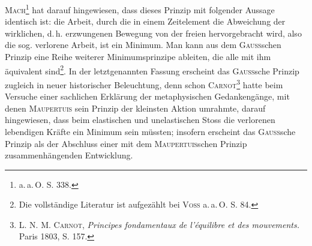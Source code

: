 \textsc{Mach}\footnote{a.\,a.\,O. S. 338.} hat darauf hingewiesen, dass dieses Prinzip mit folgender Aussage
identisch ist: die Arbeit, durch die in einem Zeitelement die Abweichung
der wirklichen, d.\,h. erzwungenen Bewegung von der freien hervorgebracht
wird, also die sog. verlorene Arbeit, ist ein Minimum. Man kann aus dem
\textsc{Gauss}schen Prinzip eine Reihe weiterer Minimumsprinzipe ableiten, die alle
mit ihm äquivalent sind\footnote{Die vollständige Literatur ist aufgezählt bei \textsc{Voss} a.\,a.\,O. S. 84.}. In der letztgenannten Fassung erscheint das \textsc{Gauss}sche
Prinzip zugleich in neuer historischer Beleuchtung, denn schon \textsc{Carnot}\footnote{L. N. M. \textsc{Carnot}, \textit{Principes fondamentaux de l’équilibre et des mouvements.} Paris 1803, S. 157.} hatte
beim Versuche einer sachlichen Erklärung der metaphysischen Gedankengänge,
mit denen \textsc{Maupertuis} sein Prinzip der kleinsten Aktion umrahmte, darauf
hingewiesen, dass beim elastischen und unelastischen Stoss die verlorenen
lebendigen Kräfte ein Minimum sein müssten; insofern erscheint das \textsc{Gauss}sche
Prinzip als der Abschluss einer mit dem \textsc{Maupertuis}schen Prinzip zusammenhängenden
Entwicklung.

